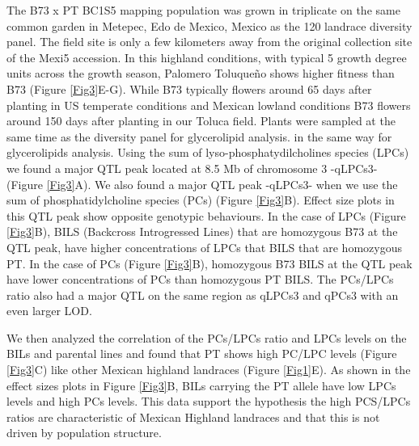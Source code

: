 \documentclass[9pt,twocolumn,twoside,lineno]{gsajnl}
\begin{document}
The B73 x PT BC1S5 mapping population was grown in triplicate on the same common garden in Metepec, Edo de Mexico, Mexico as the 120 landrace diversity panel. The field site is only a few kilometers away from the original collection site of the Mexi5 accession. In this highland conditions, with typical 5 growth degree units across the growth season, Palomero Toluqueño shows higher fitness than B73 (Figure \ref{Fig3}E-G). While B73 typically flowers around 65 days after planting in US temperate conditions and Mexican lowland conditions B73 flowers around 150 days after planting in our Toluca field. 
Plants were sampled at the same time as the diversity panel for glycerolipid analysis. in the same way for glycerolipids analysis. 
Using the sum of lyso-phosphatydilcholines species (LPCs) we found a major QTL peak located at 8.5 Mb of chromosome 3 -qLPCs3- (Figure \ref{Fig3}A). 
We also found a major QTL peak -qLPCs3- when we use the sum of phosphatidylcholine species (PCs) (Figure \ref{Fig3}B). 
Effect size plots in this QTL peak show opposite genotypic behaviours. 
In the case of LPCs (Figure \ref{Fig3}B), BILS (Backcross Introgressed Lines) that are homozygous B73 at the QTL peak, have higher concentrations of LPCs that BILS that are homozygous PT. In the case of PCs (Figure \ref{Fig3}B), homozygous B73 BILS at the QTL peak have lower concentrations of PCs than homozygous PT BILS. 
The PCs/LPCs ratio also had a major QTL on the same region as qLPCs3 and qPCs3 with an even larger LOD. 

We then analyzed the correlation of the PCs/LPCs ratio and LPCs levels on the BILs and parental lines and found that PT shows high PC/LPC levels (Figure \ref{Fig3}C) like other Mexican highland landraces (Figure \ref{Fig1}E). 
As shown in the effect sizes plots in  Figure \ref{Fig3}B, BILs carrying the PT allele have low LPCs levels and high PCs levels. This data support the hypothesis the high PCS/LPCs ratios are characteristic of Mexican Highland landraces and that this is not driven by population structure. 
\end{document}
